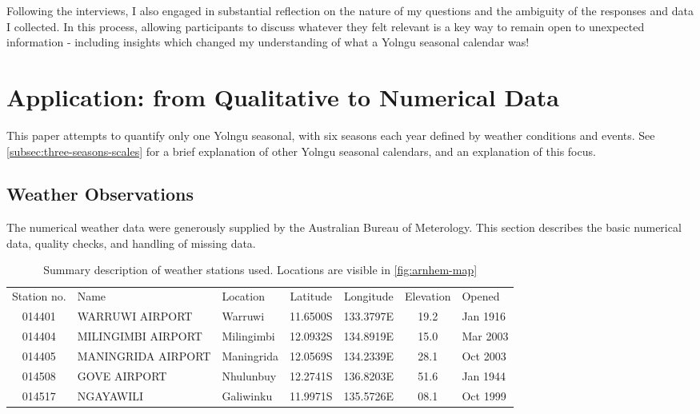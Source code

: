 Following the interviews, I also engaged in substantial reflection on the nature
of my questions and the ambiguity of the responses and data I collected.
In this process, allowing participants to discuss whatever they felt relevant
is a key way to remain open to unexpected information - including insights
which changed my understanding of what a Yolngu seasonal calendar was!






\section{Application: from Qualitative to Numerical Data}

This paper attempts to quantify only one Yolngu seasonal, with six seasons
each year defined by weather conditions and events.  See
\autoref{subsec:three-seasons-scales} for a brief explanation of other
Yolngu seasonal calendars, and an explanation of this focus.


\subsection{Weather Observations}

The numerical weather data were generously supplied by the Australian
Bureau of Meterology.  This section describes the basic numerical data,
quality checks, and handling of missing data.


\begin{table}[h]
    \centering
    \begin{tabular}{cllcccl}
        Station no.  &  Name                &  Location     &  Latitude   &  Longitude   &  Elevation  &  Opened   \\
        014401       &  WARRUWI AIRPORT     &  Warruwi      &  11.6500S   &  133.3797E   &  19.2       &  Jan 1916 \\
        014404       &  MILINGIMBI AIRPORT  &  Milingimbi   &  12.0932S   &  134.8919E   &  15.0       &  Mar 2003 \\
        014405       &  MANINGRIDA AIRPORT  &  Maningrida   &  12.0569S   &  134.2339E   &  28.1       &  Oct 2003 \\
        014508       &  GOVE AIRPORT        &  Nhulunbuy    &  12.2741S   &  136.8203E   &  51.6       &  Jan 1944 \\
        014517       &  NGAYAWILI           &  Galiwinku    &  11.9971S   &  135.5726E   &  08.1       &  Oct 1999
    \end{tabular}
    \caption[List of weather stations providing data]{
        Summary description of weather stations used.
        Locations are visible in \autoref{fig:arnhem-map}}
    \label{tab:weather-station-summary}
\end{table}

